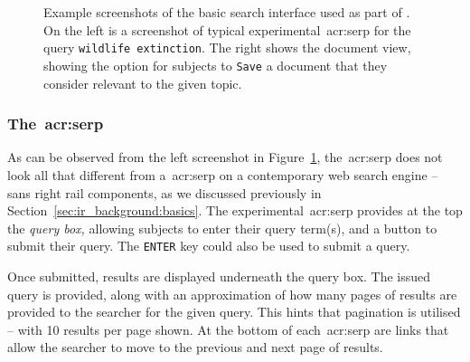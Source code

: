 \begin{figure}[t!]
    \centering
    \caption[Example screenshots of the experimental interfaces]{Example screenshots of the basic search interface used as part of \treconomics. On the left is a screenshot of typical experimental~\gls{acr:serp} for the query \texttt{wildlife extinction}. The right shows the document view, showing the option for subjects to \texttt{Save} a document that they consider relevant to the given topic.}
    \label{fig:interfaces}
\end{figure}

\subsubsection{The~\gls{acr:serp}}\label{sec:methodology:user:interface:serp}
As can be observed from the left screenshot in Figure~\ref{fig:interfaces}, the~\gls{acr:serp} does not look all that different from a~\gls{acr:serp} on a contemporary web search engine -- sans right rail components, as we discussed previously in Section~\ref{sec:ir_background:basics}. The experimental~\gls{acr:serp} provides at the top the \emph{query box,} allowing subjects to enter their query term(s), and a button to submit their query. The \texttt{ENTER} key could also be used to submit a query.

Once submitted, results are displayed underneath the query box. The issued query is provided, along with an approximation of how many pages of results are provided to the searcher for the given query. This hints that pagination is utilised -- with 10 results per page shown. At the bottom of each~\gls{acr:serp} are links that allow the searcher to move to the previous and next page of results.

\begin{figure}[h]
    \centering
    \vspace{4mm}
    \label{fig:serp_buttons}
    \vspace{-5mm}
\end{figure}

